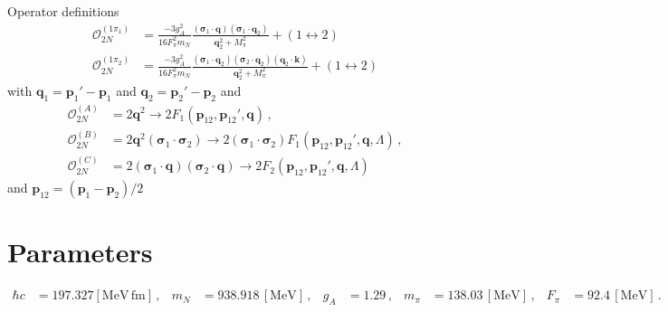 \documentclass[onecolumn]{revtex4-2}
\renewcommand{\vec}[1]{\boldsymbol{#1}}
\begin{document}
Operator definitions
\begin{align}
    \mathcal{O}_{2N}^{(1\pi_1)}
    &=
    \frac{-3 g_A^2}{16 F_\pi^2 m_N}
    \frac{(\vec \sigma_1 \cdot \vec q)(\vec \sigma_1 \cdot \vec q_2)}{\vec q_2^2 + M_\pi^2}
    + (1 \leftrightarrow 2)
    \,\\
    \mathcal{O}_{2N}^{(1\pi_2)}
    &=
    \frac{-3 g_A^2}{16 F_\pi^2 m_N}
    \frac{(\vec \sigma_1 \cdot \vec q_2)(\vec \sigma_2 \cdot \vec q_2)(\vec q_2 \cdot \vec k)}{\vec q_2^2 + M_\pi^2}
    + (1 \leftrightarrow 2)
\end{align}
with $\vec q_1 = \vec p_1' - \vec p_1$ and $\vec q_2 = \vec p_2' - \vec p_2$ and
\begin{align}
    \mathcal{O}_{2N}^{(A)}
    &=
    2 \vec q^2 \to 2 F_1(\vec p_{12}, \vec p_{12}', \vec q)
    \, , \\
    \mathcal{O}_{2N}^{(B)}
    &=
    2 \vec q^2 (\vec \sigma_1 \cdot \vec \sigma_2) \to 2 (\vec \sigma_1 \cdot \vec \sigma_2) F_1(\vec p_{12}, \vec p_{12}', \vec q, \Lambda)
    \, , \\
    \mathcal{O}_{2N}^{(C)}
    &=
    2 (\vec \sigma_1 \cdot \vec q)(\vec \sigma_2 \cdot \vec q) \to 2 F_2(\vec p_{12}, \vec p_{12}', \vec q, \Lambda)
\end{align}
and $\vec p_{12} = (\vec p_1 - \vec p_2)/2$

\section{Parameters}
\begin{align}
    \hbar c &= 197.327 [\mathrm{MeV} \, \mathrm{fm}]\, , &
    m_N &= 938.918 \, [\mathrm{MeV}] \, , &
    g_A &= 1.29 \, , &
    m_\pi &= 138.03 \, [\mathrm{MeV}] \, , &
    F_\pi &= 92.4 \, [\mathrm{MeV}] \, .
\end{align}
\end{document}
